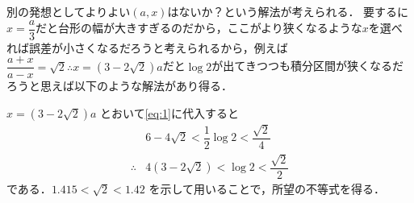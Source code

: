 \documentclass[../../main.tex]{subfiles}
\begin{document}
別の発想としてよりよい$(a,x)$はないか？という解法が考えられる．
要するに$x=\dfrac{a}{3}$だと台形の幅が大きすぎるのだから，ここがより狭くなるような$x$を選べれば誤差が小さくなるだろうと考えられるから，例えば$\dfrac{a+x}{a-x}=\sqrt{2} \therefore x = (3-2\sqrt{2})a$だと$\log 2$が出てきつつも積分区間が狭くなるだろうと思えば以下のような解法があり得る．

$x = (3 - 2\sqrt{2})a$ とおいて\cref{eq:1}に代入すると
\begin{align}
  & 6 - 4\sqrt{2} < \dfrac{1}{2} \log 2 < \dfrac{\sqrt{2}}{4} \\
  \therefore
  & 4(3 - 2\sqrt{2}) < \log 2 < \dfrac{\sqrt{2}}{2}
\end{align}
である．$1.415 < \sqrt{2} < 1.42$ を示して用いることで，所望の不等式を得る．
\end{document}
